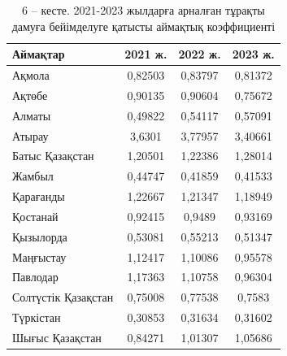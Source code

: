 \begin{table}[H]
\caption*{6 -- кесте. 2021-2023 жылдарға арналған тұрақты дамуға бейімделуге қатысты аймақтық коэффициенті}
\centering
\begin{tabular}{|lccc|}
\hline
\multicolumn{1}{|l|}{Аймақтар}        & \multicolumn{1}{c|}{2021 ж.} & \multicolumn{1}{c|}{2022 ж.} & 2023 ж. \\ \hline
\multicolumn{1}{|l|}{Ақмола}          & \multicolumn{1}{c|}{0,82503} & \multicolumn{1}{c|}{0,83797} & 0,81372 \\ \hline
\multicolumn{1}{|l|}{Ақтөбе}          & \multicolumn{1}{c|}{0,90135} & \multicolumn{1}{c|}{0,90604} & 0,75672 \\ \hline
\multicolumn{1}{|l|}{Алматы}          & \multicolumn{1}{c|}{0,49822} & \multicolumn{1}{c|}{0,54117} & 0,57091 \\ \hline
\multicolumn{1}{|l|}{Атырау}          & \multicolumn{1}{c|}{3,6301}  & \multicolumn{1}{c|}{3,77957} & 3,40661 \\ \hline
\multicolumn{1}{|l|}{Батыс Қазақстан} & \multicolumn{1}{c|}{1,20501} & \multicolumn{1}{c|}{1,22386} & 1,28014 \\ \hline
\multicolumn{1}{|l|}{Жамбыл}          & \multicolumn{1}{c|}{0,44747} & \multicolumn{1}{c|}{0,41859} & 0,41533 \\ \hline
\multicolumn{1}{|l|}{Қарағанды}       & \multicolumn{1}{c|}{1,22667} & \multicolumn{1}{c|}{1,21347} & 1,18949 \\ \hline
\multicolumn{1}{|l|}{Қостанай}        & \multicolumn{1}{c|}{0,92415} & \multicolumn{1}{c|}{0,9489}  & 0,93169 \\ \hline
\multicolumn{1}{|l|}{Қызылорда}       & \multicolumn{1}{c|}{0,53081} & \multicolumn{1}{c|}{0,55213} & 0,51347 \\ \hline
\multicolumn{1}{|l|}{Маңғыстау}       & \multicolumn{1}{c|}{1,12417} & \multicolumn{1}{c|}{1,10086} & 0,95578 \\ \hline
\multicolumn{1}{|l|}{Павлодар}        & \multicolumn{1}{c|}{1,17363} & \multicolumn{1}{c|}{1,10758} & 0,96304 \\ \hline
\multicolumn{1}{|l|}{Солтүстік Қазақстан} & \multicolumn{1}{c|}{0,75008} & \multicolumn{1}{c|}{0,77538} & 0,7583 \\ \hline
\multicolumn{1}{|l|}{Түркістан}       & \multicolumn{1}{c|}{0,30853} & \multicolumn{1}{c|}{0,31634} & 0,31602 \\ \hline
\multicolumn{1}{|l|}{Шығыс Қазақстан} & \multicolumn{1}{c|}{0,84271} & \multicolumn{1}{c|}{1,01307} & 1,05686 \\ \hline

\end{tabular}
\end{table}
